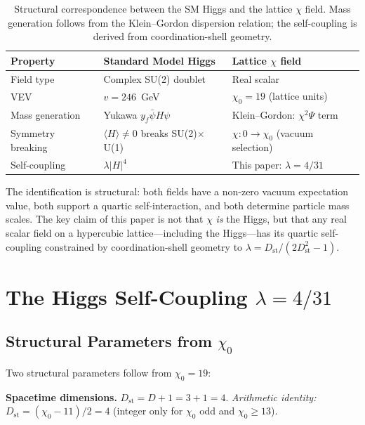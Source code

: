 \documentclass[12pt,a4paper]{article}
\newcommand{\chizero}{\chi_0}
\newcommand{\Dst}{D_{\mathrm{st}}}
\begin{document}
\begin{table}[h]
\centering
\begin{tabular}{lll}
\toprule
Property & Standard Model Higgs & Lattice $\chi$ field \\
\midrule
Field type & Complex SU(2) doublet & Real scalar \\
VEV & $v = 246$~GeV & $\chizero = 19$ (lattice units) \\
Mass generation & Yukawa $y_f \bar\psi H \psi$ & Klein--Gordon: $\chi^2\Psi$ term \\
Symmetry breaking & $\langle H \rangle \neq 0$ breaks SU(2)$\times$U(1) & $\chi: 0 \to \chizero$ (vacuum selection) \\
Self-coupling & $\lambda|H|^4$ & This paper: $\lambda = 4/31$ \\
\bottomrule
\end{tabular}
\caption{Structural correspondence between the SM Higgs and the lattice $\chi$ field. Mass generation follows from the Klein--Gordon dispersion relation; the self-coupling is derived from coordination-shell geometry.}
\label{tab:higgs}
\end{table}

The identification is structural: both fields have a non-zero vacuum expectation value, both support a quartic self-interaction, and both determine particle mass scales. The key claim of this paper is not that $\chi$ \textit{is} the Higgs, but that any real scalar field on a hypercubic lattice---including the Higgs---has its quartic self-coupling constrained by coordination-shell geometry to $\lambda = \Dst/(2\Dst^2 - 1)$.


\section{The Higgs Self-Coupling \texorpdfstring{$\lambda = 4/31$}{lambda = 4/31}}\label{sec:prediction}

\subsection{Structural Parameters from \texorpdfstring{$\chizero$}{chi0}}

Two structural parameters follow from $\chizero = 19$:

\textbf{Spacetime dimensions.} $\Dst = D + 1 = 3 + 1 = 4$. \textit{Arithmetic identity:} $\Dst = (\chizero - 11)/2 = 4$ (integer only for $\chizero$ odd and $\chizero \geq 13$).
\end{document}
